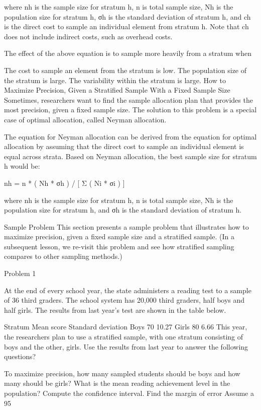 where nh is the sample size for stratum h, n is total sample size, Nh is the population size for stratum h, σh is the standard deviation of stratum h, and ch is the direct cost to sample an individual element from stratum h. Note that ch does not include indirect costs, such as overhead costs.

The effect of the above equation is to sample more heavily from a stratum when

The cost to sample an element from the stratum is low.
The population size of the stratum is large.
The variability within the stratum is large.
How to Maximize Precision, Given a Stratified Sample With a Fixed Sample Size
Sometimes, researchers want to find the sample allocation plan that provides the most precision, given a fixed sample size. The solution to this problem is a special case of optimal allocation, called Neyman allocation.

The equation for Neyman allocation can be derived from the equation for optimal allocation by assuming that the direct cost to sample an individual element is equal across strata. Based on Neyman allocation, the best sample size for stratum h would be:

nh = n * ( Nh * σh ) / [ Σ ( Ni * σi ) ]

where nh is the sample size for stratum h, n is total sample size, Nh is the population size for stratum h, and σh is the standard deviation of stratum h.

Sample Problem
This section presents a sample problem that illustrates how to maximize precision, given a fixed sample size and a stratified sample. (In a subsequent lesson, we re-visit this problem and see how stratified sampling compares to other sampling methods.)

Problem 1

At the end of every school year, the state administers a reading test to a sample of 36 third graders. The school system has 20,000 third graders, half boys and half girls. The results from last year's test are shown in the table below.

Stratum	Mean score	Standard deviation
Boys	70	10.27
Girls	80	6.66
This year, the researchers plan to use a stratified sample, with one stratum consisting of boys and the other, girls. Use the results from last year to answer the following questions?

To maximize precision, how many sampled students should be boys and how many should be girls?
What is the mean reading achievement level in the population?
Compute the confidence interval.
Find the margin of error
Assume a 95%

